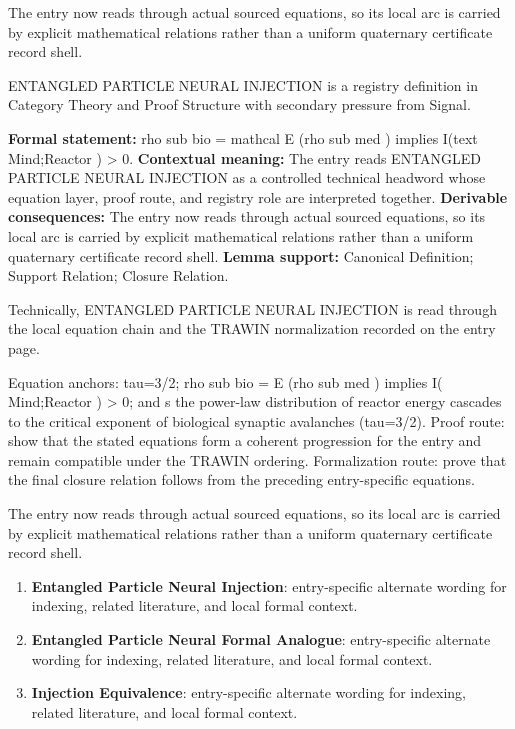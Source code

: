 The entry now reads through actual sourced equations, so its local arc is carried by explicit mathematical relations rather than a uniform quaternary certificate record shell.
\clearpage


\begingroup\small
{}
ENTANGLED PARTICLE NEURAL INJECTION is a registry definition in Category Theory and Proof Structure with secondary pressure from Signal.

\begingroup\footnotesize\setlength{\emergencystretch}{3em}\sloppy
\textbf{Formal statement:} rho sub bio = mathcal E (rho sub med ) implies I(text Mind;Reactor ) > 0. \textbf{Contextual meaning:} The entry reads ENTANGLED PARTICLE NEURAL INJECTION as a controlled technical headword whose equation layer, proof route, and registry role are interpreted together. \textbf{Derivable consequences:} The entry now reads through actual sourced equations, so its local arc is carried by explicit mathematical relations rather than a uniform quaternary certificate record shell. \textbf{Lemma support:} Canonical Definition; Support Relation; Closure Relation.\par
\endgroup

Technically, ENTANGLED PARTICLE NEURAL INJECTION is read through the local equation chain and the TRAWIN normalization recorded on the entry page.

Equation anchors: tau=3/2; rho sub bio = E (rho sub med ) implies I( Mind;Reactor ) > 0; and s the power-law distribution of reactor energy cascades to the critical exponent of biological synaptic avalanches (tau=3/2). Proof route: show that the stated equations form a coherent progression for the entry and remain compatible under the TRAWIN ordering. Formalization route: prove that the final closure relation follows from the preceding entry-specific equations.

The entry now reads through actual sourced equations, so its local arc is carried by explicit mathematical relations rather than a uniform quaternary certificate record shell.
\endgroup

\begin{enumerate}[leftmargin=1.6em,itemsep=6pt,topsep=4pt]
\item \textbf{Entangled Particle Neural Injection}: entry-specific alternate wording for indexing, related literature, and local formal context.
\item \textbf{Entangled Particle Neural Formal Analogue}: entry-specific alternate wording for indexing, related literature, and local formal context.
\item \textbf{Injection Equivalence}: entry-specific alternate wording for indexing, related literature, and local formal context.
\end{enumerate}


